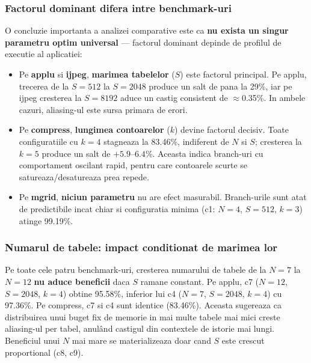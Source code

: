 \subsubsection*{Factorul dominant difera intre benchmark-uri}

O concluzie importanta a analizei comparative este ca \textbf{nu exista un singur
parametru optim universal} --- factorul dominant depinde de profilul de executie
al aplicatiei:

\begin{itemize}
    \item Pe \textbf{applu} si \textbf{ijpeg}, \textbf{marimea tabelelor} ($S$)
          este factorul principal. Pe applu, trecerea de la $S=512$ la $S=2048$
          produce un salt de pana la 29\%, iar pe ijpeg cresterea la $S=8192$
          aduce un castig consistent de $\approx$0.35\%. In ambele cazuri,
          aliasing-ul este sursa primara de erori.

    \item Pe \textbf{compress}, \textbf{lungimea contoarelor} ($k$) devine
          factorul decisiv. Toate configuratiile cu $k=4$ stagneaza la 83.46\%,
          indiferent de $N$ si $S$; cresterea la $k=5$ produce un salt de
          $+5.9$--$6.4$\%. Aceasta indica branch-uri cu comportament oscilant
          rapid, pentru care contoarele scurte se satureaza/desatureaza prea
          repede.

    \item Pe \textbf{mgrid}, \textbf{niciun parametru} nu are efect masurabil.
          Branch-urile sunt atat de predictibile incat chiar si configuratia
          minima (c1: $N=4$, $S=512$, $k=3$) atinge 99.19\%.
\end{itemize}

\subsubsection*{Numarul de tabele: impact conditionat de marimea lor}

Pe toate cele patru benchmark-uri, cresterea numarului de tabele de la $N=7$ la
$N=12$ \textbf{nu aduce beneficii} daca $S$ ramane constant. Pe applu, c7
($N=12$, $S=2048$, $k=4$) obtine 95.58\%, inferior lui c4 ($N=7$, $S=2048$,
$k=4$) cu 97.36\%. Pe compress, c7 si c4 sunt identice (83.46\%). Aceasta
sugereaza ca distribuirea unui buget fix de memorie in mai multe tabele mai mici
creste aliasing-ul per tabel, anulând castigul din contextele de istorie mai
lungi. Beneficiul unui $N$ mai mare se materializeaza doar cand $S$ este crescut
proportional (c8, c9).

